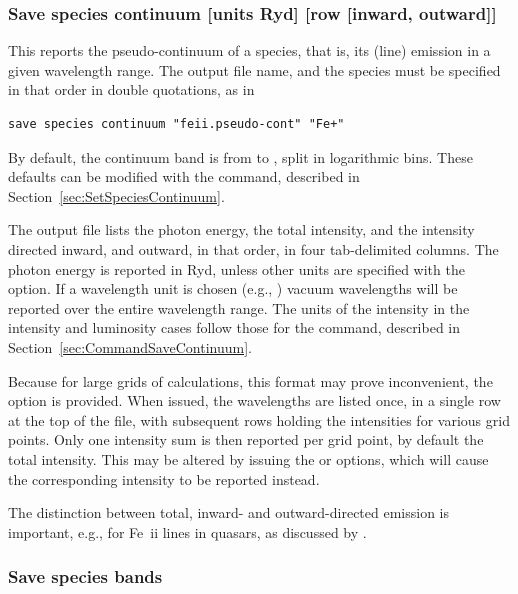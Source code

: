 \subsubsection{Save species continuum [units Ryd] [row [inward, outward]]}
\label{sec:SaveSpeciesContinuum}
This reports the pseudo-continuum of a species, that is, its (line)
emission in a given wavelength range.
The output file name, and the species must be specified in that
order in double quotations, as in
%
\begin{verbatim}
save species continuum "feii.pseudo-cont" "Fe+"
\end{verbatim}
%
By default, the continuum band is from \speciesConWlLo{} to \speciesConWlHi{}, 
split in \speciesConNbins{} logarithmic bins.
These defaults can be modified with the 
command, described in Section~\ref{sec:SetSpeciesContinuum}.

\par
The output file lists the photon energy, the total intensity,
and the intensity directed inward, and outward, in that order,
in four tab-delimited columns.
The photon energy is reported in Ryd, unless other units are
specified with the  option.
If a wavelength unit is chosen (e.g., )
vacuum wavelengths will be reported over the entire wavelength range.
The units of the intensity in the intensity and luminosity
cases follow those for the  command,
described in Section~\ref{sec:CommandSaveContinuum}.

Because for large grids of calculations, this format may prove
inconvenient, the  option is provided.
When issued, the wavelengths are listed once, in a single row
at the top of the file, with subsequent rows holding the intensities
for various grid points.
Only one intensity sum is then reported per grid point,
by default the total intensity.
This may be altered by issuing the  or
 options, which will cause the corresponding
intensity to be reported instead.

The distinction between total, inward- and outward-directed emission
is important, e.g., for Fe~{\sc ii} lines in quasars, as discussed
by \citet{FerlandHuEtAl2009}.


\subsubsection{Save species bands}
\label{sec:SaveSpeciesBands}

